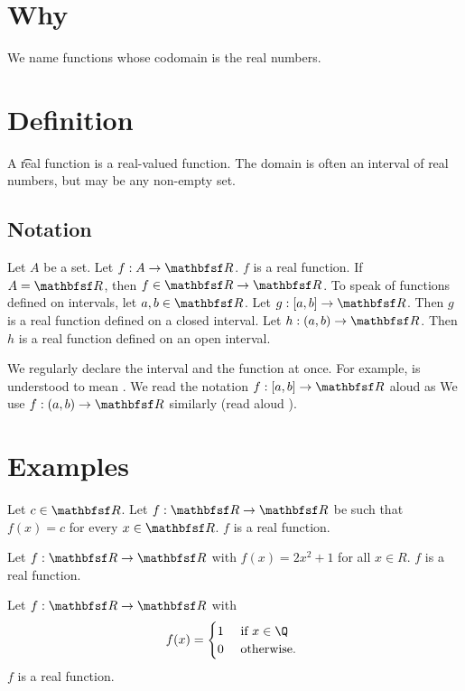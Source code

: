 
\section*{Why}

We name functions whose codomain is the real numbers.

\section*{Definition}

A \t{real function} is a real-valued function.
The domain is often an interval of real numbers, but may be any non-empty set.

\subsection*{Notation}

Let $A$ be a set.
Let $f: A \to \R $.
$f$ is a real function.
If $A = \R $, then $f \in \R  \to \R $.
To speak of functions defined on intervals, let $a, b \in \R $.
Let $g: [a, b] \to \R $.
Then $g$ is a real function defined on a closed interval.
Let $h: (a, b) \to \R $.
Then $h$ is a real function defined on an open interval.

We regularly declare the interval and the function at once.
For example,  is understood to mean .
We read the notation $f: [a, b] \to \R $ aloud as 
We use $f: (a, b) \to \R $ similarly (read aloud ).

\section*{Examples}

\begin{expl}
Let $c \in \R $.
Let $f: \R  \to \R $ be such that $f(x) = c$ for every $x \in \R $.
$f$ is a real function.
\end{expl}

\begin{expl}
Let $f: \R  \to \R $ with $f(x) = 2x^2 + 1$ for all $x \in R$.
$f$ is a real function.
\end{expl}

\begin{expl}
Let $f: \R  \to \R $ with
  \[
f(x) = \begin{cases}
1 & \text{ if } x \in \Q  \\
0 & \text{ otherwise. }
\end{cases}
  \]
$f$ is a real function.
\end{expl}
